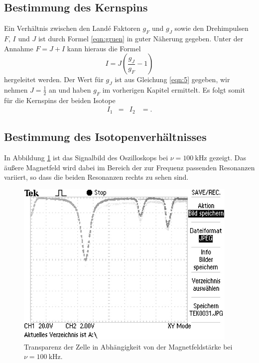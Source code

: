 \subsection{Bestimmung des Kernspins}

Ein Verhältnis zwischen den Land\'{e} Faktoren $g_F$ und $g_J$ sowie den Drehimpulsen $F$, $I$ und $J$ ist durch Formel \eqref{eqn:gruen} in guter Näherung gegeben.
Unter der Annahme $F = J+I$ kann hieraus die Formel
\begin{equation}
  I = J ( \frac{g_J}{g_F} - 1)
\end{equation}
hergeleitet werden.
Der Wert für $g_J$ ist aus Gleichung \eqref{eqn:5} gegeben, wir nehmen $J = \frac{1}{2}$ an und haben $g_F$ im vorherigen Kapitel ermittelt.
Es folgt somit für die Kernspins der beiden Isotope
\begin{align*}
  I_1 &=  & I_2 &= .
\end{align*}

\subsection{Bestimmung des Isotopenverhältnisses}

In Abbildung \ref{fig:typisch} ist das Signalbild des Oszilloskops bei $\nu = \SI{100}{\kilo\hertz}$ gezeigt.
Das äußere Magnetfeld wird dabei im Bereich der zur Frequenz passenden Resonanzen variiert, so dass die beiden Resonanzen rechts zu sehen sind.

\begin{figure}
  \centering
  \includegraphics[height=8cm]{ressources/TEK0031.png}
  \caption{Transparenz der Zelle in Abhängigkeit von der Magnetfeldstärke bei $\nu = \SI{100}{\kilo\hertz}$.}
  \label{fig:typisch}
\end{figure}

